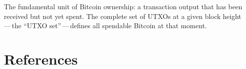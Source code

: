 \documentclass[11pt, twoside, openright]{book}
\begin{document}
\begin{description}[leftmargin=0pt, labelindent=0pt, style=nextline, itemsep=8pt]
  \enlargethispage{2\baselineskip}
  \item[UTXO (Unspent Transaction Output).] The fundamental unit of Bitcoin ownership: a transaction output that has been received but not yet spent. The complete set of UTXOs at a given block height\,---\,the ``UTXO set''\,---\,defines all spendable Bitcoin at that moment.
\end{description}

\chapter{References}
\end{document}
